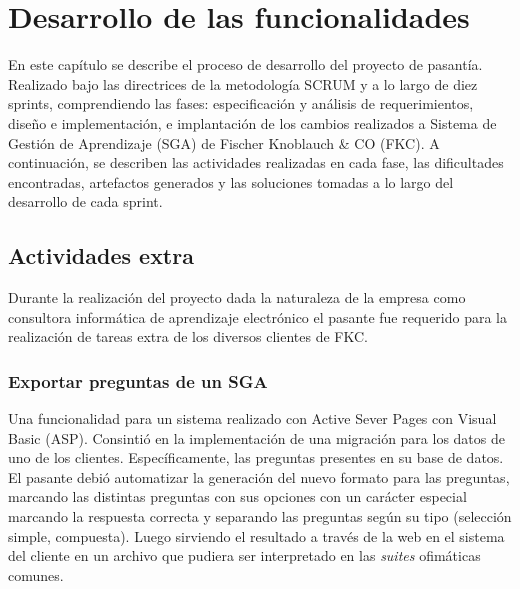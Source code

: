 ﻿\chapter{Desarrollo de las funcionalidades}
\thispagestyle{empty} %

En este capítulo se describe el proceso de desarrollo del proyecto de pasantía. Realizado bajo las directrices de la metodología SCRUM y a lo largo de diez sprints, comprendiendo las fases: especificación y análisis de requerimientos, diseño e implementación, e implantación de los cambios realizados a Sistema de Gestión de Aprendizaje (SGA) de Fischer Knoblauch \& CO (FKC). A continuación, se describen las actividades realizadas en cada fase, las dificultades encontradas, artefactos generados y las soluciones tomadas a lo largo del desarrollo de cada sprint.












\section{Actividades extra} %
\label{sec:actividades_extra}

Durante la realización del proyecto dada la naturaleza de la empresa como consultora informática de aprendizaje electrónico el pasante fue requerido para la realización de tareas extra de los diversos clientes de FKC.

	\subsection{Exportar preguntas de un SGA} %
	\label{sub:exportar_preguntas_de_un_sga}


	Una funcionalidad para un sistema realizado con Active Sever Pages con Visual Basic (ASP). Consintió en la implementación de una migración para los datos de uno de los clientes. Específicamente, las preguntas presentes en su base de datos. El pasante debió automatizar la generación del nuevo formato para las preguntas, marcando las distintas preguntas con sus opciones con un carácter especial marcando la respuesta correcta y separando las preguntas según su tipo (selección simple, compuesta). Luego sirviendo el resultado a través de la web en el sistema del cliente en un archivo que pudiera ser interpretado en las \emph{suites} ofimáticas comunes.

